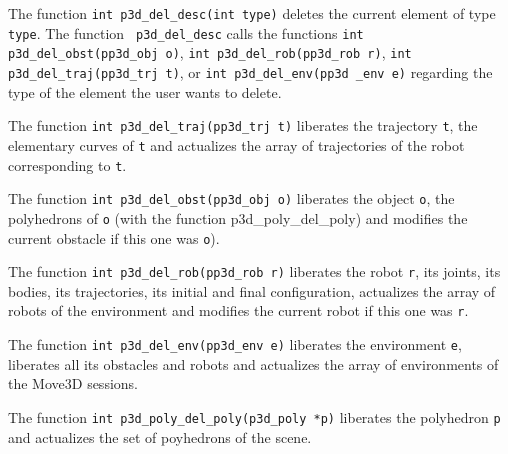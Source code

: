 The function {\tt int p3d\_del\_desc(int type)} 
deletes the current element of type {\tt type}. The function {\tt
p3d\_del\_desc} calls the functions {\tt int p3d\_del\_obst(pp3d\_obj
o)}, {\tt int p3d\_del\_rob(pp3d\_rob r)}, {\tt int
p3d\_del\_traj(pp3d\_trj t)}, or {\tt int p3d\_del\_env(pp3d \_env e)}
regarding the type of the element the user wants to delete. 

The function {\tt int p3d\_del\_traj(pp3d\_trj t)}
 liberates the
trajectory {\tt t}, the elementary curves of {\tt t} and actualizes
the array of trajectories of the robot corresponding to {\tt t}.

The function {\tt int p3d\_del\_obst(pp3d\_obj o)}
 liberates the
object {\tt o}, the polyhedrons of {\tt o} (with the function
p3d\_poly\_del\_poly) and modifies the current obstacle if this one
was {\tt o}).

The function {\tt int p3d\_del\_rob(pp3d\_rob r)}
 liberates the robot
{\tt r}, its joints, its bodies, its trajectories, its initial and
final configuration, actualizes the array of robots of the environment
and modifies the current robot if this one was {\tt r}. 

The function {\tt int p3d\_del\_env(pp3d\_env e)}
 liberates the
environment {\tt e}, liberates all its obstacles and robots and
actualizes the array of environments of the Move3D sessions.

The function {\tt int p3d\_poly\_del\_poly(p3d\_poly *p)}
 liberates
the polyhedron {\tt p} and actualizes the set of poyhedrons of the
scene.




